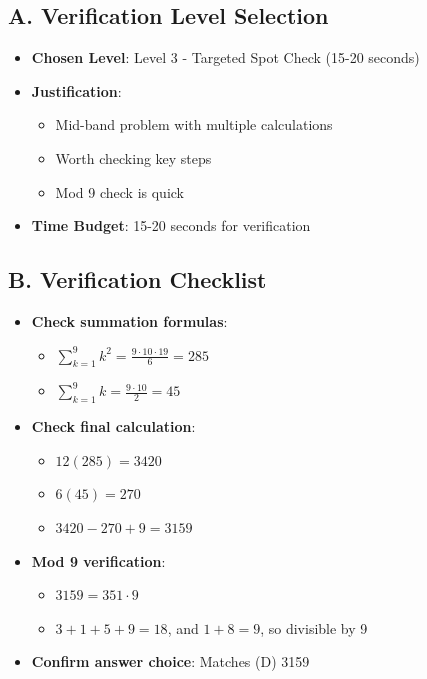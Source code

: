 \documentclass[12pt]{article}
\begin{document}
\begin{verificationbox}
\subsection*{A. Verification Level Selection}
\begin{itemize}[leftmargin=*]
    \item \textbf{Chosen Level}: Level 3 - Targeted Spot Check (15-20 seconds)
    \item \textbf{Justification}: 
    \begin{itemize}
        \item Mid-band problem with multiple calculations
        \item Worth checking key steps
        \item Mod 9 check is quick
    \end{itemize}
    \item \textbf{Time Budget}: 15-20 seconds for verification
\end{itemize}

\subsection*{B. Verification Checklist}
\begin{itemize}[leftmargin=*]
    \item \textbf{Check summation formulas}:
    \begin{itemize}
        \item $\sum_{k=1}^{9} k^2 = \frac{9 \cdot 10 \cdot 19}{6} = 285$ \checkmark
        \item $\sum_{k=1}^{9} k = \frac{9 \cdot 10}{2} = 45$ \checkmark
    \end{itemize}
    \item \textbf{Check final calculation}:
    \begin{itemize}
        \item $12(285) = 3420$ \checkmark
        \item $6(45) = 270$ \checkmark
        \item $3420 - 270 + 9 = 3159$ \checkmark
    \end{itemize}
    \item \textbf{Mod 9 verification}:
    \begin{itemize}
        \item $3159 = 351 \cdot 9$ \checkmark
        \item $3+1+5+9 = 18$, and $1+8 = 9$, so divisible by 9 \checkmark
    \end{itemize}
    \item \textbf{Confirm answer choice}: Matches (D) 3159 \checkmark
\end{itemize}


\end{verificationbox}
\end{document}
